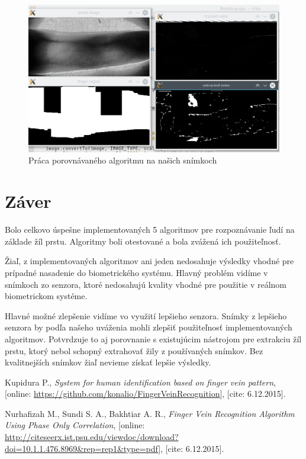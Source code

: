 \documentclass[11pt,a4paper]{article}
\begin{document}
\begin{landscape}
\begin{figure}[ht!]
	\centering
	\includegraphics[width=27cm]{fig/test_nas.eps}
	\caption{\label{fig:test_nas} Práca porovnávaného algoritmu na našich snímkoch}
\end{figure}
\end{landscape}

\clearpage
\section{Záver} \label{zaver}

Bolo celkovo úspešne implementovaných 5 algoritmov pre rozpoznávanie ľudí na
základe žíl prstu. Algoritmy boli otestované a bola zvážená ich použiteľnosť.

Žiaľ, z implementovaných algoritmov ani jeden nedosahuje výsledky vhodné pre
prípadné nasadenie do biometrického systému. Hlavný problém vidíme v snímkoch zo
senzora, ktoré nedosahujú kvality vhodné pre použitie v reálnom biometrickom
systéme.

Hlavné možné zlepšenie vidíme vo využití lepšieho senzora. Snímky z lepšieho
senzora by podľa našeho uváženia mohli zlepšiť použiteľnosť implementovaných
algoritmov. Potvrdzuje to aj porovnanie s existujúcim nástrojom pre extrakciu
žíl prstu, ktorý nebol schopný extrahovať žily z používaných snímkov. Bez
kvalitnejších snímkov žiaľ nevieme získať lepšie výsledky.

\clearpage



\begin{thebibliography}{99}

	Kupidura P.,
	\emph{System for human identification based on finger vein pattern},
	[online: \url{https://github.com/konalio/FingerVeinRecognition}],
	[cite: 6.12.2015].

	Nurhafizah M., Sundi S. A., Bakhtiar A. R.,
		\emph{Finger Vein Recognition Algorithm Using Phase Only Correlation},
	[online: \url{http://citeseerx.ist.psu.edu/viewdoc/download?doi=10.1.1.476.8969&rep=rep1&type=pdf}],
	[cite: 6.12.2015].

\end{thebibliography}
\end{document}
